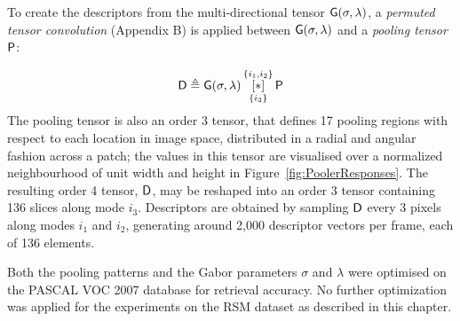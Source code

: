 To create the descriptors from the multi-directional tensor $\mathsf{G}(\sigma,\lambda)$, a {\it permuted tensor convolution} (Appendix B) is applied between $\mathsf{G}(\sigma,\lambda)$ and a {\it pooling tensor} $\mathsf{P}$:  

\begin{equation}
\mathsf{D} \triangleq \mathsf{G}(\sigma,\lambda) \, 
   \underset{\lbrace i_3 \rbrace}{\overset{\lbrace i_1,i_2\rbrace}{[ \ast ]}}\, {\mathsf{P}}
\end{equation}
The pooling tensor is also an order 3 tensor, that defines 17 pooling regions with respect to each location in image space, distributed in a radial and angular fashion across a patch; the values in this tensor are visualised over a normalized neighbourhood of unit width and height in Figure~\ref{fig:PoolerResponses}. The resulting order 4 tensor, $\mathsf{D}$, may be reshaped \citep{kolda2009tensor} into an order 3 tensor containing 136 slices along mode $i_3$. Descriptors are obtained by sampling $\mathsf{D}$ every 3 pixels along modes $i_1$ and $i_2$, generating around 2,000 descriptor vectors per frame, each of 136 elements.

Both the pooling patterns and the Gabor parameters $\sigma$ and $\lambda$ were optimised on the PASCAL VOC 2007 database \citep{everingham2010pascal} for retrieval accuracy. No further optimization was applied for the experiments on the RSM dataset as described in this chapter.


